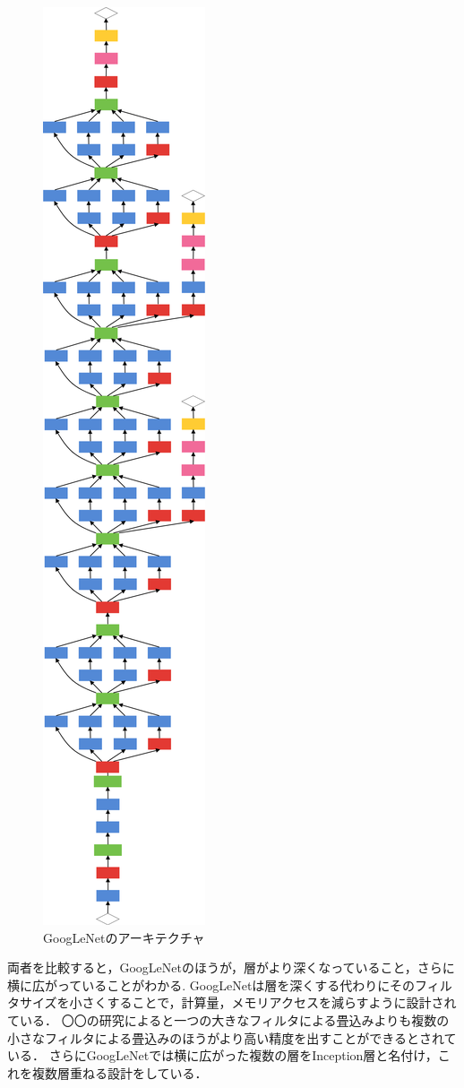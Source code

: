 {\begin{figure}[h]
  \centering
  \includegraphics[scale=0.2]{./chap2/fig/googlenet.png}
  \caption{GoogLeNetのアーキテクチャ}
  \label{fig:googlenet}
\end{figure}
両者を比較すると，GoogLeNetのほうが，層がより深くなっていること，さらに横に広がっていることがわかる.
GoogLeNetは層を深くする代わりにそのフィルタサイズを小さくすることで，計算量，メモリアクセスを減らすように設計されている．
〇〇の研究によると一つの大きなフィルタによる畳込みよりも複数の小さなフィルタによる畳込みのほうがより高い精度を出すことができるとされている．
さらにGoogLeNetでは横に広がった複数の層をInception層と名付け，これを複数層重ねる設計をしている．

}
